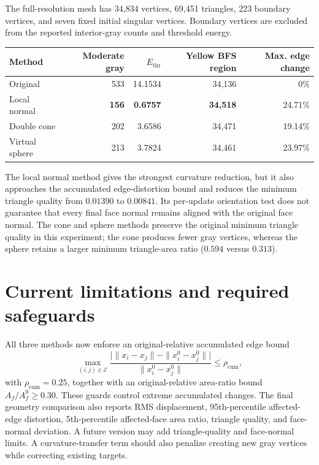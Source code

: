 \documentclass[10pt]{article}
\newcommand{\E}{\mathcal{E}}
\begin{document}
The full-resolution mesh has 34,834 vertices, 69,451 triangles, 223 boundary
vertices, and seven fixed initial singular vertices.  Boundary vertices are
excluded from the reported interior-gray counts and threshold energy.

\begin{center}
\begin{tabular}{lrrrr}
\toprule
Method & Moderate gray & $E_{\mathrm{thr}}$ & Yellow BFS region & Max. edge change\\
\midrule
Original & 533 & 14.1534 & 34,136 & 0\%\\
Local normal & \textbf{156} & \textbf{0.6757} & \textbf{34,518} & 24.71\%\\
Double cone & 202 & 3.6586 & 34,471 & 19.14\%\\
Virtual sphere & 213 & 3.7824 & 34,461 & 23.97\%\\
\bottomrule
\end{tabular}
\end{center}

The local normal method gives the strongest curvature reduction, but it also
approaches the accumulated edge-distortion bound and reduces the minimum triangle
quality from $0.01390$ to $0.00841$.  Its per-update orientation test does not
guarantee that every final face normal remains aligned with the original face
normal.  The cone and sphere methods preserve the original minimum triangle
quality in this experiment; the cone produces fewer gray vertices, whereas the
sphere retains a larger minimum triangle-area ratio ($0.594$ versus $0.313$).

\section{Current limitations and required safeguards}

All three methods now enforce an original-relative accumulated edge bound
\begin{equation}
\max_{(i,j)\in\E}
\frac{\big|\|x_i-x_j\|-\|x_i^0-x_j^0\|\big|}{\|x_i^0-x_j^0\|}
\leq\rho_{\mathrm{cum}},
\end{equation}
with $\rho_{\mathrm{cum}}=0.25$, together with an original-relative area-ratio
bound $A_f/A_f^0\geq0.30$.  These guards control extreme accumulated changes.
The final geometry comparison also reports RMS displacement, 95th-percentile
affected-edge distortion, 5th-percentile affected-face area ratio, triangle
quality, and face-normal deviation.  A future version may add triangle-quality
and face-normal limits.  A curvature-transfer term should also penalize creating
new gray vertices while correcting existing targets.
\end{document}
